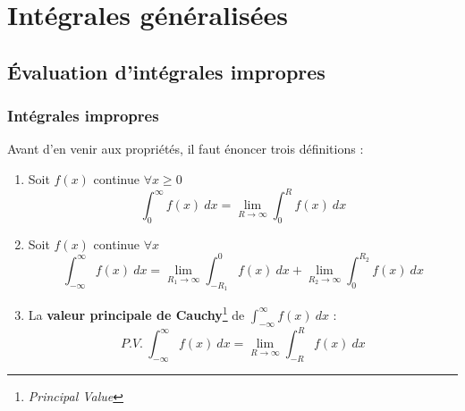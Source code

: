 \chapter{Intégrales généralisées}
\section{Évaluation d'intégrales impropres}
	\subsection{Intégrales impropres}
	Avant d'en venir aux propriétés, il faut énoncer trois définitions :
	\begin{enumerate}
	\item Soit $f(x)$ continue $\forall x \geq0$
	\begin{equation}
	\int_0^\infty f(x)\ dx = \lim\limits_{R\rightarrow\infty}\int_0^R f(x)\
	dx
	\end{equation}
	
	\item Soit $f(x)$ continue $\forall x$
	\begin{equation}
	\int_{-\infty}^\infty f(x)\ dx = \lim\limits_{R_1\rightarrow\infty} \int_{-R_1}^0 f(x)\ 
	dx + \lim\limits_{R_2\rightarrow\infty} \int^{R_2}_0 f(x)\ 	dx
	\label{eq:DecompoInt}
	\end{equation}
	
	\item La \textbf{valeur principale de Cauchy}\footnote{\textit{Principal Value}} de 
	$\int_{-\infty}^\infty f(x)\ dx$ :
	\begin{equation}
	P.V.\ \int_{-\infty}^\infty f(x)\ dx = \lim\limits_{R\rightarrow\infty} \int_{-R}^R f(x)\ 
	dx
	\end{equation}
	\end{enumerate}
	
	
